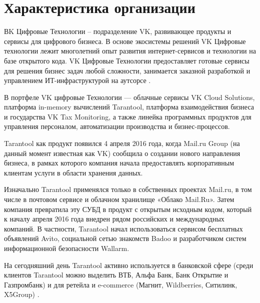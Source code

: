 
\section{Характеристика организации}

ВK Цифровые Технологии – подразделение VK, развивающее продукты и сервисы для
цифрового бизнеса. В основе экосистемы решений VK Цифровые технологии лежит
многолетний опыт развития интернет-сервисов и технологии на базе открытого
кода. VK Цифровые Технологии предоставляет готовые сервисы для решения бизнес
задач любой сложности, занимается заказной разработкой и управлением
ИТ-инфраструктурой на аутсорсе \cite{VkTech}.

В портфеле VK цифровые Технологии — облачные сервисы VK Cloud Solutions,
платформа in-memory вычислений Tarantool, платформа взаимодействия бизнеса и
государства VK Tax Monitoring, а также линейка программных продуктов для
управления персоналом, автоматизации производства и бизнес-процессов.

Tarantool как продукт появился 4 апреля 2016 года, когда Mail.ru Group (на
данный момент известная как VK) сообщила о создании нового направления бизнеса,
в рамках которого компания начала предоставлять корпоративным клиентам услуги в
области хранения данных.

Изначально Tarantool применялся только в собственных проектах Mail.ru, в том
числе в почтовом сервисе и облачном хранилище «Облако Mail.Ru». Затем компания
превратила эту СУБД в продукт с открытым исходным кодом, который к началу
апреля 2016 года внедрен рядом российских и международных компаний. В
частности, Tarantool начал использоваться сервисом бесплатных объявлений Avito,
социальной сетью знакомств Badoo и разработчиком систем информационной
безопасности Wallarm.

На сегодняшний день Tarantool активно используется в банковской сфере (среди
клиентов Tarantool можно выделить ВТБ, Альфа Банк, Банк Открытие и Газпромбанк)
и для ретейла и e-commerce (Магнит, Wildberries, Ситилинк, X5Group)
\cite{Tarantool}.
